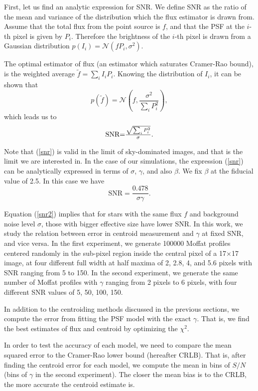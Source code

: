 \documentclass[12pt, preprint]{aastex}
\newcommand{\beq}{\begin{equation}}
\newcommand{\eeq}{\end{equation}}
\begin{document}
First, let us find an analytic expression for SNR. We define SNR as the ratio of the mean and variance of the distribution which the flux estimator is drawn from. Assume that the total flux from the point source is $f$, and that the PSF at the $i$-th pixel is given by $P_{i}$. Therefore the brightness of the $i$-th pixel is drawn from a Gaussian distribution $p(I_{i}) = \mathcal{N}(fP_{i},\sigma^{2})$. 

The optimal estimator of flux (an estimator which saturates Cramer-Rao bound), is the weighted average $\tilde{f}=\sum_{i}I_{i}P_{i}$. Knowing the distribution of $I_{i}$, it can be shown that 
\beq
p(\tilde{f}) = \mathcal{N}(f , \frac{\sigma^{2}}{\sum_{i}P_{i}^{2}}),
\eeq  
which leads us to
\beq
\begin{array}{l}
\text{SNR} $=$ \frac{\sqrt{\sum_{i} P_{i}^{2}}}{\sigma}.
\end{array}
\label{snr}
\eeq

Note that (\ref{snr}) is valid in the limit of sky-dominated images, and that is the limit we are interested in. In the case of our simulations, the expression (\ref{snr}) can be analytically expressed in terms of $\sigma$, $\gamma$, and also $\beta$. We fix $\beta$ at the fiducial value of 2.5. In this case we have
\beq
\text{SNR} = \frac{0.478}{\sigma \gamma}.
\label{snr2}
\eeq

Equation (\ref{snr2}) implies that for stars with the same flux $f$ and background noise level $\sigma$, those with bigger effective size have lower SNR.
In this work, we study the relation between error in centroid measurement and $\gamma$ at fixed SNR, and vice versa. In the first experiment, we generate 100000 Moffat profiles centered randomly in the sub-pixel region inside the central pixel of a 17$\times$17 image, at four different full width at half maxima of 2, 2.8, 4, and 5.6 pixels with SNR ranging from 5 to 150. In the second experiment, we generate the same number of Moffat profiles with $\gamma$ ranging from 2 pixels to 6 pixels, with four different SNR values of 5, 50, 100, 150.

In addition to the centroiding methods discussed in the previous sections, we compute the error from fitting the PSF model with the exact $\gamma$. That is, we find the best estimates of flux and centroid by optimizing the $\chi^{2}$. 

In order to test the accuracy of each model, we need to compare the mean squared error to the Cramer-Rao lower bound (hereafter CRLB). That is, after finding the centroid error for each model, we compute the mean in bins of $S/N$ (bins of $\gamma$ in the second experiment). The closer the mean bias is to the CRLB, the more accurate the centroid estimate is.
\end{document}
